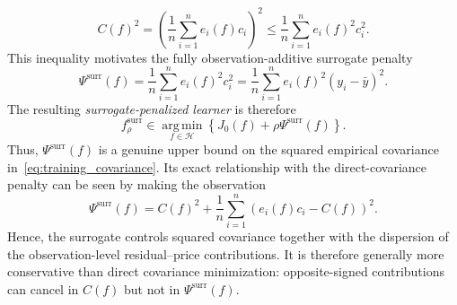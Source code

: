 \documentclass[10pt]{article}
\theoremstyle{definition}
\newcommand{\1}{\mathbf{1}}
\newcommand{\Hcal}{\mathcal{H}}
\newcommand{\argminop}{\operatorname*{arg\,min}}
\begin{document}
{{{
\begin{equation}
\label{eq:surrogate_upper_bound}
C(f)^2
=
\left(
\frac{1}{n}\sum_{i=1}^n e_i(f)c_i
\right)^2
\leq
\frac{1}{n}\sum_{i=1}^n e_i(f)^2c_i^2.
\end{equation}
}
{This inequality motivates the fully observation-additive surrogate penalty}
\begin{equation}
\label{eq:surrogate}
\Psi^{\mathrm{surr}}(f)
=
\frac{1}{n}\sum_{i=1}^n e_i(f)^2c_i^2
=
\frac{1}{n}\sum_{i=1}^n
e_i(f)^2(y_i-\bar y)^2.
\end{equation}
The resulting \emph{surrogate-penalized learner} is therefore
\begin{equation}
\label{eq:surrogate_learning}
f_\rho^{\mathrm{surr}}
\in
\argminop_{f\in\Hcal}
\left\{
{J_0(f)}
+
\rho\Psi^{\mathrm{surr}}(f)
\right\}.
\end{equation}
{
Thus, $\Psi^{\mathrm{surr}}(f)$ is a genuine upper bound on the squared empirical covariance in~\eqref{eq:training_covariance}. Its exact relationship with the direct-covariance penalty can be seen by making the observation
\begin{equation}
\label{eq:surrogate_decomposition}
\Psi^{\mathrm{surr}}(f)
=
C(f)^2
+
\frac{1}{n}
\sum_{i=1}^n
\left(e_i(f)c_i-C(f)\right)^2.
\end{equation}
Hence, the surrogate controls squared covariance together with the dispersion of the observation-level residual--price contributions. It is therefore generally more conservative than direct covariance minimization: opposite-signed contributions can cancel in $C(f)$ but not in $\Psi^{\mathrm{surr}}(f)$.
}


}}
\end{document}
